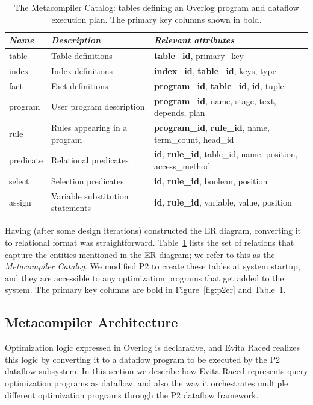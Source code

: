 \begin{table}
\small{
\begin{tabular}{|l|l|l|} \hline
{\it Name}& {\it Description} & {\it Relevant attributes} \\ \hline\hline
table     & Table definitions & {\bf table\_id}, primary\_key\\ \hline
index     & Index definitions & {\bf index\_id}, {\bf table\_id}, keys, type \\ \hline
fact      & Fact definitions  & {\bf program\_id}, {\bf table\_id}, {\bf id}, tuple\\ \hline
program   & User program description     & {\bf program\_id}, name, stage, text, depends, plan \\ \hline
rule      & Rules appearing in a program   & {\bf program\_id}, {\bf rule\_id}, name,  term\_count, head\_id \\ \hline
predicate & Relational predicates  & {\bf id}, {\bf rule\_id}, table\_id, name, position, access\_method \\ \hline
select    & Selection predicates  & {\bf id}, {\bf rule\_id}, boolean, position \\  \hline
assign    & Variable substitution statements & {\bf id}, {\bf rule\_id}, variable, value, position \\ \hline 
\end{tabular}
}
\ssp
\caption{The Metacompiler Catalog: tables defining an Overlog program and dataflow execution plan.
                The primary key columns shown in bold. }
\label{tbl:catalog}
\end{table}

Having (after some design iterations) constructed the ER diagram, converting it to relational format was
straightforward. Table~\ref{tbl:catalog} lists the set of relations that capture the entities 
mentioned in the ER diagram; we refer to this as the {\em Metacompiler Catalog}. We modified P2 to create these tables
at system startup, and they are accessible to any optimization programs that get added to the system. The primary key 
columns are bold in  Figure~\ref{fig:p2er} and Table~\ref{tbl:catalog}.

\subsection{Metacompiler Architecture}
\label{sec:metaarch}
Optimization logic expressed in Overlog is declarative, and Evita Raced realizes this logic by converting it to a dataflow program to be executed by the P2 dataflow subsystem.  In this section we describe how Evita Raced represents query optimization programs as dataflow, and also the way it orchestrates multiple different optimization programs through the P2 dataflow framework.

